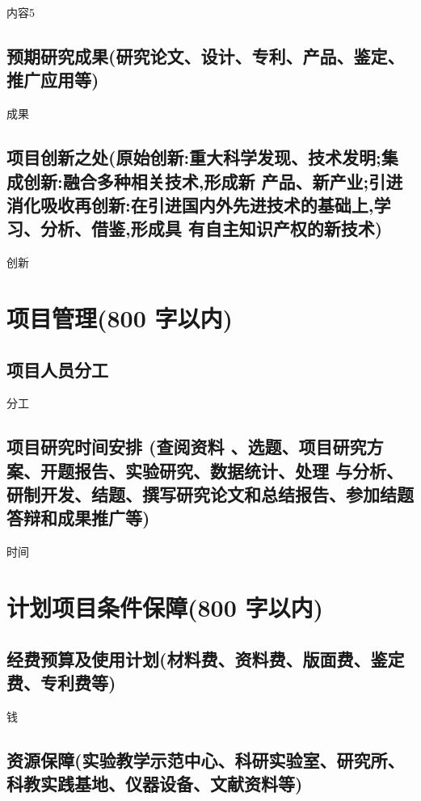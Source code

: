 \documentclass[a4paper,zihao=5,UTF8, twoside]{ctexart}
\begin{document}
内容5


\tableSeparator

\subsection{预期研究成果\small{(研究论文、设计、专利、产品、鉴定、推广应用等)}}

成果


\tableSeparator

\subsection{项目创新之处\small{(原始创新:重大科学发现、技术发明;集成创新:融合多种相关技术,形成新
		产品、新产业;引进消化吸收再创新:在引进国内外先进技术的基础上,学习、分析、借鉴,形成具
		有自主知识产权的新技术)}}

创新


\section{项目管理(800 字以内)}

\subsection{项目人员分工}

分工


\tableSeparator

\subsection{项目研究时间安排 (查阅资料 、选题、项目研究方案、开题报告、实验研究、数据统计、处理
	与分析、研制开发、结题、撰写研究论文和总结报告、参加结题答辩和成果推广等)}

时间

\section{计划项目条件保障(800 字以内)}

\subsection{经费预算及使用计划(材料费、资料费、版面费、鉴定费、专利费等)}

钱


\tableSeparator

\subsection{资源保障(实验教学示范中心、科研实验室、研究所、科教实践基地、仪器设备、文献资料等)}
\end{document}
